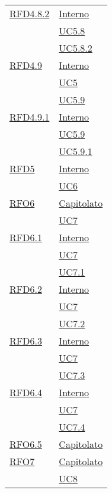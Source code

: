 \begin{longtable}{|>{\centering}m{5cm}|m{5cm}<{\centering}|}
\hyperlink{RFD4.8.2}{RFD4.8.2} & \hyperlink{Interno}{Interno}\\
& \hyperref[UC5.8]{UC5.8}\\
& \hyperref[UC5.8.2]{UC5.8.2}\\ \hline

\hyperlink{RFD4.9}{RFD4.9} & \hyperlink{Interno}{Interno}\\
& \hyperref[UC5]{UC5}\\
& \hyperref[UC5.9]{UC5.9}\\ \hline

\hyperlink{RFD4.9.1}{RFD4.9.1} & \hyperlink{Interno}{Interno}\\
& \hyperref[UC5.9]{UC5.9}\\
& \hyperref[UC5.9.1]{UC5.9.1}\\ \hline

\hyperlink{RFD5}{RFD5} & \hyperlink{Interno}{Interno}\\
& \hyperref[UC6]{UC6}\\ \hline

\hyperlink{RFO6}{RFO6} & \hyperlink{Capitolato}{Capitolato}\\
& \hyperref[UC7]{UC7}\\ \hline

\hyperlink{RFD6.1}{RFD6.1} & \hyperlink{Interno}{Interno}\\
& \hyperref[UC7]{UC7}\\
& \hyperref[UC7.1]{UC7.1}\\ \hline

\hyperlink{RFD6.2}{RFD6.2} & \hyperlink{Interno}{Interno}\\
& \hyperref[UC7]{UC7}\\
& \hyperref[UC7.2]{UC7.2}\\ \hline

\hyperlink{RFD6.3}{RFD6.3} & \hyperlink{Interno}{Interno}\\
& \hyperref[UC7]{UC7}\\
& \hyperref[UC7.3]{UC7.3}\\ \hline

\hyperlink{RFD6.4}{RFD6.4} & \hyperlink{Interno}{Interno}\\
& \hyperref[UC7]{UC7}\\
& \hyperref[UC7.4]{UC7.4}\\ \hline

\hyperlink{RFO6.5}{RFO6.5} & \hyperlink{Capitolato}{Capitolato}\\ \hline

\hyperlink{RFO7}{RFO7} & \hyperlink{Capitolato}{Capitolato}\\
& \hyperref[UC8]{UC8}\\ \hline


\end{longtable}
